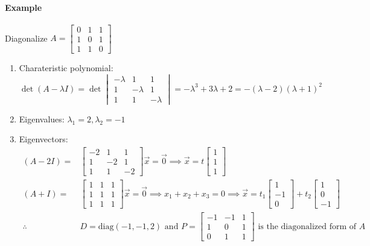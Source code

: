 \paragraph*{Example}
Diagonalize $A = \begin{bmatrix}
    0 & 1 & 1 \\
    1 & 0 & 1 \\
    1 & 1 & 0
\end{bmatrix}$
\begin{enumerate}
    \item Charateristic polynomial: $\det(A - \lambda I) = \det\begin{vmatrix}
    -\lambda & 1 & 1 \\
    1 & -\lambda & 1 \\
    1 & 1 & -\lambda
\end{vmatrix} = -\lambda^3 + 3\lambda + 2 = -(\lambda - 2)(\lambda + 1)^2$
    \item Eigenvalues: $\lambda_1 = 2, \lambda_2 = -1$
    \item Eigenvectors: \begin{align*}
        (A - 2I) = &\begin{bmatrix}
        -2 & 1 & 1 \\
        1 & -2 & 1 \\
        1 & 1 & -2
        \end{bmatrix} \vec{x} = \vec{0} \implies \vec{x} = t \begin{bmatrix}
        1 \\
        1 \\
        1
        \end{bmatrix} \\
        (A + I) = &\begin{bmatrix}
        1 & 1 & 1 \\
        1 & 1 & 1 \\
        1 & 1 & 1
        \end{bmatrix} \vec{x} = \vec{0} \implies x_1 + x_2 + x_3 = 0 \implies \vec{x} = t_1 \begin{bmatrix}
        1 \\
        -1 \\
        0
        \end{bmatrix} + t_2 \begin{bmatrix}
        1 \\
        0 \\
        -1
        \end{bmatrix} \\
        \therefore \quad &D = \text{diag}(-1, -1, 2) \text{ and } P = \begin{bmatrix}
            -1 & -1 & 1 \\
            1 & 0 & 1 \\
            0 & 1 & 1
        \end{bmatrix} \text{ is the diagonalized form of } A
    \end{align*}
\end{enumerate}

